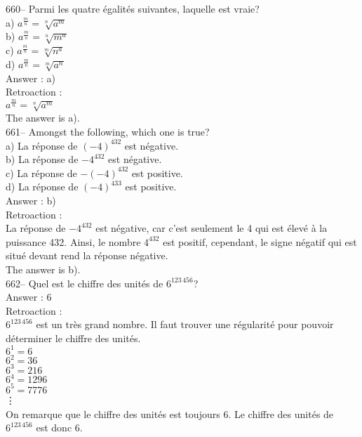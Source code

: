 ﻿\documentclass[letterpaper, 12pt]{article}
\begin{document}
660-- Parmi les quatre \'egalit\'es suivantes, laquelle est vraie?\\
a) $a^{\frac{m}{n}}=\sqrt[n]{a^{m}}$\\[2mm]
b) $a^{\frac{m}{n}}=\sqrt[n]{m^{a}}$\\[2mm]
c) $a^{\frac{m}{n}}=\sqrt[m]{n^{a}}$\\[2mm]
d) $a^{\frac{m}{n}}=\sqrt[m]{a^{n}}$\\

Answer : a)\\

Retroaction : \\
$a^{\frac{m}{n}}=\sqrt[n]{a^{m}}$\\
The answer is a).\\

661-- Amongst the following, which one is true?\\
a) La r\'eponse de $(-4)^{432}$ est n\'egative.\\
b) La r\'eponse de $-4^{432}$ est n\'egative.\\
c) La r\'eponse de $-(-4)^{432}$ est positive.\\
d) La r\'eponse de $(-4)^{433}$ est positive.\\

Answer : b)\\

Retroaction : \\
La r\'eponse de $-4^{432}$ est n\'egative, car c'est seulement le 4
qui est \'elev\'e \`a la puissance 432. Ainsi, le nombre $4^{432}$
est positif,
cependant, le signe n\'egatif qui est situ\'e devant rend la r\'eponse
n\'egative.\\
The answer is b).\\

662-- Quel est le chiffre des unit\'es de $6^{123\,456}$?\\

Answer : 6\\

Retroaction : \\
$6^{123\,456}$ est un tr\`es grand nombre.  Il faut trouver une
r\'egularit\'e pour pouvoir d\'eterminer le chiffre des unit\'es.\\
$6^{1}=6$\\
$6^{2}=36$\\
$6^{3}=216$\\
$6^{4}=1296$\\
$6^{5}=7776$\\
\vdots\\
On remarque que le chiffre des unit\'es est toujours 6.  Le chiffre des
unit\'es de $6^{123\,456}$ est donc 6.  \\
\end{document}
